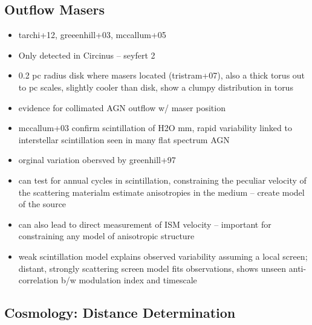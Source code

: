 \subsection{Outflow Masers}
\label{sub:h2o_outflows}

\begin{itemize}
\item tarchi+12, greeenhill+03, mccallum+05
\item Only detected in Circinus -- seyfert 2 
\item 0.2 pc radius disk where masers located (tristram+07), also a thick torus out to pc scales, slightly cooler than disk, show a clumpy distribution in torus
\item evidence for collimated AGN outflow w/ maser position
\item mccallum+03 confirm scintillation of H2O mm, rapid variability linked to interstellar scintillation seen in many flat spectrum AGN
\item orginal variation obersved by greenhill+97
\item can test for annual cycles in scintillation, constraining the peculiar velocity of the scattering materialm estimate anisotropies in the medium -- create model of the source
\item can also lead to direct measurement of ISM velocity -- important for constraining any model of anisotropic structure
\item weak scintillation model explains observed variability assuming a local screen; distant, strongly scattering screen model fits observations, shows unseen anti-correlation b/w modulation index and timescale
\end{itemize}

\subsection{Cosmology: Distance Determination}
\label{sub:h2o_cosmo}


